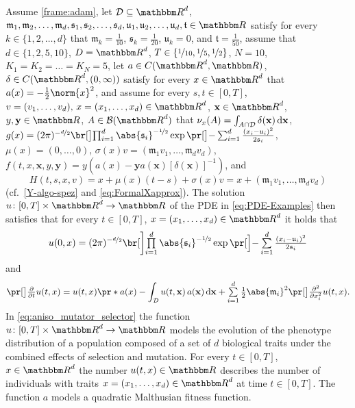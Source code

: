 Assume 
	\cref{frame:adam}, 
let
	$\mathcal D\subseteq \R^d$,
	$\mathfrak{m}_1,\mathfrak{m}_2,\dots,\mathfrak{m}_d,\mathfrak{s}_1,\mathfrak{s}_2,\dots,\mathfrak{s}_d,\mathfrak{u}_1, \mathfrak{u}_2, \dots,\mathfrak{u}_d,\mathfrak t \in \R$
satisfy 
	for every
		$k \in \{1,2,\dots,d\}$
	that
		$\mathfrak{m}_k = \tfrac{1}{10}$,
		$\mathfrak{s}_k = \tfrac{1}{20}$,
		$\mathfrak{u}_k = 0$,
		and
		$\mathfrak t=\tfrac1{50}$,
assume that
	$d\in\{1,2,5,10\}$,
	$\D = \R^d$,
	$T\in\{\nicefrac1{10},\nicefrac{1}{5},\nicefrac{1}{2}\}$,
	$N=10$,
	$K_1 = K_2 = \ldots = K_N= 5$,
let
	$a\in C(\R^d,\R)$,
	$\delta\in C(\R^d,(0,\infty))$
satisfy 
	for every
		$x \in \R^d$
	that
		$a(x) = -\frac{1}{2}\norm{x}^2$,
and assume 
	for every 
		$s,t \in [0,T]$,
		$v= (v_1,\dots,v_d),\,x = (x_1,\dots,x_d)\in \R^d$, 
		$\mathbf{x} \in \R^d$,
		$y,\mathbf{y} \in \R$,
		$A\in\Borel(\R^d)$
	that
		$\nu_x(A)=\int_{A\cap \mathcal D}\delta(\mathbf x)\,\mathrm{d}\mathbf{x}$,
		$g(x)= (2\pi)^{-\nicefrac{d}{2}}\bbr{ \prod_{ i = 1 }^d \abs{\mathfrak{s}_i}^{-\nicefrac{1}{2}}} \exp \bpr{-\sum_{i = 1}^d  \frac{(x_i - \mathfrak{u}_i )^2}{2\mathfrak{s}_i}}$,
		$\mu(x)=(0,\dots,0)$,
		$\sigma(x)v=(\mathfrak{m}_1 v_1, \dots, \mathfrak{m}_d v_d)$, 
		$f(t,x,\mathbf{x},y,\mathbf{y}
		) = y(a(x)-\mathbf y a(\mathbf x)[\delta(\mathbf x)]^{-1})$,
		and
	\begin{equation}
		\label{eq:Hrepmut}
		H(t,s,x,v)
		=
		x + \mu(x)(t-s)+ \sigma(x)v
		=
		x+(\mathfrak m_1v_1,\dots,\mathfrak m_dv_d)
	\end{equation}
	(cf.\ \eqref{Y-algo-spez} and \eqref{eq:FormalXapprox}).
The solution 
	$u\colon[0,T]\times \R^d \to \R$ 
	of the PDE in \eqref{eq:PDE-Examples} then satisfies that 
		for every
			$t\in [0,T]$,
			$x = (x_1, \dots, x_d) \in \R^d$
		it holds that
			\begin{equation}
				u(0,x)= (2\pi)^{-\nicefrac{d}{2}}\bbbbr{ \smallprodl_{ i = 1 }^d \abs{\mathfrak{s}_i}^{-\nicefrac{1}{2}}} \exp \bbpr{-\smallsuml_{i = 1}^d  \tfrac{(x_i - \mathfrak{u}_i )^2}{2\mathfrak{s}_i}}
			\end{equation} 
			and
\begin{equation}
	\bpr{\tfrac{\partial }{\partial t}u} (t,x) 
	=
	u(t,x)\pr*{a(x) - \int_{\mathcal D} u(t,\mathbf{x})\, a(\mathbf{x}) \, \diff\mathbf{x} } 
	+  
	\smallsuml_{i=1}^{d} \tfrac{1}{2} \abs{\mathfrak{m}_i}^2 \bpr{\tfrac{\partial^2 }{\partial x_i^2} u} (t,x)
	.
   \label{eq:aniso_mutator_selector}
\end{equation}
%
In \eqref{eq:aniso_mutator_selector} the function $u\colon[0,T]\times\R^d\to\R$ models the evolution of the phenotype distribution of a population composed of a set of $d$ biological traits under the combined effects of selection and mutation. 
For every $t\in[0,T]$, $x\in\R^d$ the number $u(t,x) \in \R$ describes the number of individuals with traits $x = (x_1, \dots, x_d) \in \R^d$ at time $t \in [0,T]$.
The function $a$ models a quadratic Malthusian fitness function.

